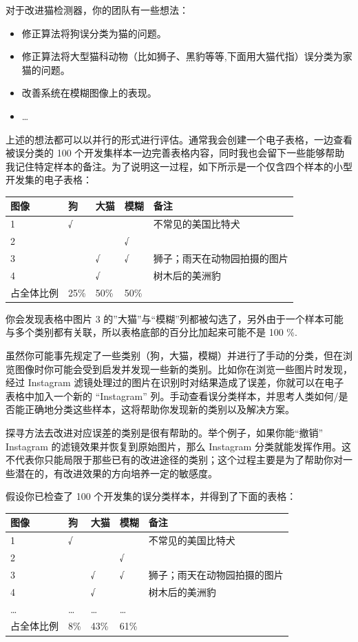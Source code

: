 对于改进猫检测器，你的团队有一些想法：

\begin{itemize}
\tightlist
\item
  修正算法将狗误分类为猫的问题。
\item
  修正算法将大型猫科动物（比如狮子、黑豹等等,下面用大猫代指）误分类为家猫的问题。
\item
  改善系统在模糊图像上的表现。
\item
  \ldots{}
\end{itemize}

上述的想法都可以以并行的形式进行评估。通常我会创建一个电子表格，一边查看被误分类的
100
个开发集样本一边完善表格内容，同时我也会留下一些能够帮助我记住特定样本的备注。为了说明这一过程，如下所示是一个仅含四个样本的小型开发集的电子表格：

\begin{longtable}[]{@{}lllll@{}}
\toprule
图像 & 狗 & 大猫 & 模糊 & 备注 \\
\midrule
\endhead
1 & √ & & & 不常见的美国比特犬 \\
2 & & & √ & \\
3 & & √ & √ & 狮子；雨天在动物园拍摄的图片 \\
4 & & √ & & 树木后的美洲豹 \\
占全体比例 & 25\% & 50\% & 50\% & \\
\bottomrule
\end{longtable}

你会发现表格中图片 3
的''大猫''与``模糊''列都被勾选了，另外由于一个样本可能与多个类别都有关联，所以表格底部的百分比加起来可能不是
100 \%.

虽然你可能事先规定了一些类别（狗，大猫，模糊）并进行了手动的分类，但在浏览图像时你可能会受到启发并发现一些新的类别。比如你在浏览一些图片时发现，经过
Instagram
滤镜处理过的图片在识别时对结果造成了误差，你就可以在电子表格中加入一个新的
``Instagram''
列。手动查看误分类样本，并思考人类如何/是否能正确地分类这些样本，这将帮助你发现新的类别以及解决方案。

探寻方法去改进对应误差的类别是很有帮助的。举个例子，如果你能``撤销''
Instagram 的滤镜效果并恢复到原始图片，那么 Instagram
分类就能发挥作用。这不代表你只能局限于那些已有的改进途径的类别；这个过程主要是为了帮助你对一些潜在的，有改进效果的方向培养一定的敏感度。

假设你已检查了 100 个开发集的误分类样本，并得到了下面的表格：

\begin{longtable}[]{@{}lllll@{}}
\toprule
图像 & 狗 & 大猫 & 模糊 & 备注 \\
\midrule
\endhead
1 & √ & & & 不常见的美国比特犬 \\
2 & & & √ & \\
3 & & √ & √ & 狮子；雨天在动物园拍摄的图片 \\
4 & & √ & & 树木后的美洲豹 \\
\ldots{} & \ldots{} & \ldots{} & \ldots{} & \\
占全体比例 & 8\% & 43\% & 61\% & \\
\bottomrule
\end{longtable}

